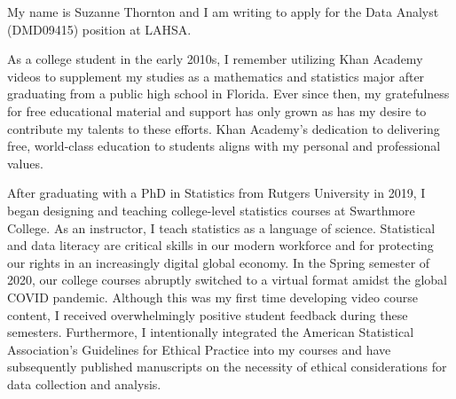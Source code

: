 \documentclass[11pt,a4paper,sans]{moderncv}
\begin{document}

	
	My name is Suzanne Thornton and I am writing to apply for the Data Analyst (DMD09415) position at LAHSA. 
	
	
	
	
	
	
	As a college student in the early 2010s, I remember utilizing Khan Academy videos to supplement my studies as a mathematics and statistics major after graduating from a public high school in Florida. Ever since then, my gratefulness for free educational material and support has only grown as has my desire to contribute my talents to these efforts. Khan Academy's dedication to delivering free, world-class education to students aligns with my personal and professional values. %
	
	After graduating with a PhD in Statistics from Rutgers University in 2019, I began designing and teaching college-level statistics courses at Swarthmore College. As an instructor, I teach statistics as a language of science. Statistical and data literacy are critical skills in our modern workforce and for protecting our rights in an increasingly digital global economy. In the Spring semester of 2020, our college courses abruptly switched to a virtual format amidst the global COVID pandemic. Although this was my first time developing video course content, I received overwhelmingly positive student feedback during these semesters. Furthermore, I intentionally integrated the American Statistical Association's Guidelines for Ethical Practice into my courses and have subsequently published manuscripts on the necessity of ethical considerations for data collection and analysis. 
	
\end{document}

